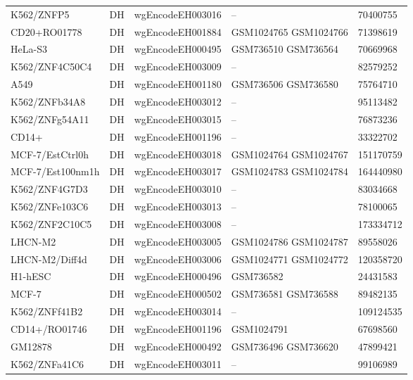 \begin{longtable}{p{3.5cm}p{1.2cm}p{3.7cm}p{2.5cm}p{2.8cm}}
K562/ZNFP5 & DH & wgEncodeEH003016 & -- & 70400755 \\
CD20+RO01778 & DH & wgEncodeEH001884 & GSM1024765 \newline GSM1024766 & 71398619 \\
HeLa-S3 & DH & wgEncodeEH000495 & GSM736510 \newline GSM736564 & 70669968 \\
K562/ZNF4C50C4 & DH & wgEncodeEH003009 & -- & 82579252 \\
A549 & DH & wgEncodeEH001180 & GSM736506 \newline GSM736580 & 75764710 \\
K562/ZNFb34A8 & DH & wgEncodeEH003012 & -- & 95113482 \\
K562/ZNFg54A11 & DH & wgEncodeEH003015 & -- & 76873236 \\
CD14+ & DH & wgEncodeEH001196 & -- & 33322702 \\
MCF-7/EstCtrl0h & DH & wgEncodeEH003018 & GSM1024764 \newline GSM1024767 & 151170759 \\
MCF-7/Est100nm1h & DH & wgEncodeEH003017 & GSM1024783 \newline GSM1024784 & 164440980 \\
K562/ZNF4G7D3 & DH & wgEncodeEH003010 & -- & 83034668 \\
K562/ZNFe103C6 & DH & wgEncodeEH003013 & -- & 78100065 \\
K562/ZNF2C10C5 & DH & wgEncodeEH003008 & -- & 173334712 \\
LHCN-M2 & DH & wgEncodeEH003005 & GSM1024786 \newline GSM1024787 & 89558026 \\
LHCN-M2/Diff4d & DH & wgEncodeEH003006 & GSM1024771 \newline GSM1024772 & 120358720 \\
H1-hESC & DH & wgEncodeEH000496 & GSM736582 & 24431583 \\
MCF-7 & DH & wgEncodeEH000502 & GSM736581 \newline GSM736588 & 89482135 \\
K562/ZNFf41B2 & DH & wgEncodeEH003014 & -- & 109124535 \\
CD14+/RO01746 & DH & wgEncodeEH001196 & GSM1024791 & 67698560 \\
GM12878 & DH & wgEncodeEH000492 & GSM736496 \newline GSM736620 & 47899421 \\
K562/ZNFa41C6 & DH & wgEncodeEH003011 & -- & 99106989 \\

\end{longtable}

